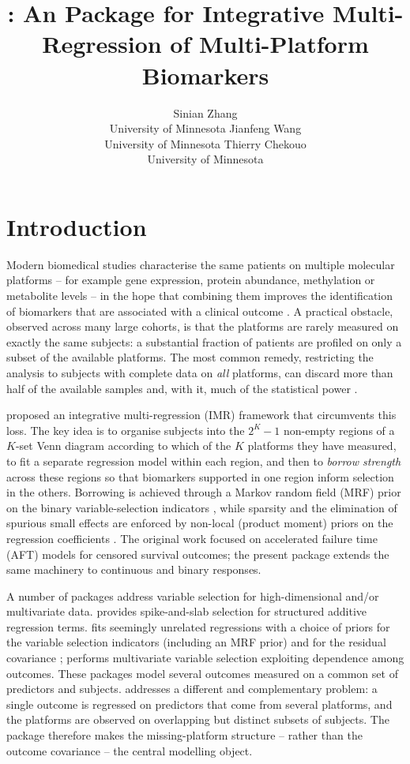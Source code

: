 \documentclass[article]{jss}
\author{Sinian Zhang\\University of Minnesota \And
        Jianfeng Wang\\University of Minnesota \And
        Thierry Chekouo\\University of Minnesota}
\title{\pkg{IntegMultiReg}: An \proglang{R} Package for Integrative
  \proglang{Bayesian} Multi-Regression of Multi-Platform Biomarkers}
\begin{document}
\clearpage

\section{Introduction}\label{sec:intro}

Modern biomedical studies characterise the same patients on multiple molecular
platforms -- for example gene expression, protein abundance, methylation or
metabolite levels -- in the hope that combining them improves the identification
of biomarkers that are associated with a clinical outcome
\citep{chekouo2015,chekouo2017}. A practical obstacle, observed across many
large cohorts, is that the platforms are rarely measured on exactly the same
subjects: a substantial fraction of patients are profiled on only a subset of
the available platforms. The most common remedy, restricting the analysis to
subjects with complete data on \emph{all} platforms, can discard more than half
of the available samples and, with it, much of the statistical power
\citep{chekouo2017}.

\citet{chekouo2017} proposed an integrative multi-regression (IMR) framework
that circumvents this loss. The key idea is to organise subjects into the
$2^{K}-1$ non-empty regions of a $K$-set Venn diagram according to which of the
$K$ platforms they have measured, to fit a separate regression model within
each region, and then to \emph{borrow strength} across these regions so that
biomarkers supported in one region inform selection in the others. Borrowing is
achieved through a Markov random field (MRF) prior on the binary
variable-selection indicators \citep{li2010,stingo2011,peterson2015}, while
sparsity and the elimination of spurious small effects are enforced by non-local
(product moment) priors on the regression coefficients
\citep{johnson2012,rossell2017}. The original work focused on accelerated
failure time (AFT) models for censored survival outcomes; the present package
extends the same machinery to continuous and binary responses.

A number of  packages address  variable selection
for high-dimensional and/or multivariate data. 
\citep{scheipl2011} provides spike-and-slab selection for structured additive
regression terms.  \citep{zhao2021}
fits seemingly unrelated regressions with a choice of priors for the variable
selection indicators (including an MRF prior) and for the residual covariance
\citep{bottolo2021};  \citep{lee2017} performs multivariate
 variable selection exploiting dependence among outcomes.
These packages model several outcomes measured on a common set of predictors and
subjects.  addresses a different and complementary problem:
a single outcome is regressed on predictors that come from several platforms,
and the platforms are observed on overlapping but distinct subsets of subjects.
The package therefore makes the missing-platform structure -- rather than the
outcome covariance -- the central modelling object.
\end{document}
